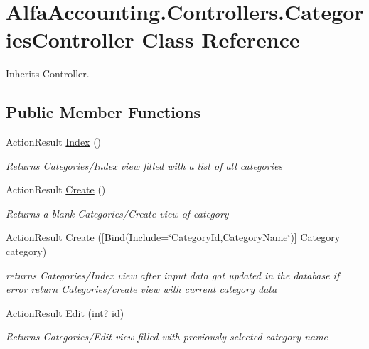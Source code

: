 \hypertarget{class_alfa_accounting_1_1_controllers_1_1_categories_controller}{}\section{Alfa\+Accounting.\+Controllers.\+Categories\+Controller Class Reference}
\label{class_alfa_accounting_1_1_controllers_1_1_categories_controller}


Inherits Controller.

\subsection*{Public Member Functions}
\begin{DoxyCompactItemize}
\item 
Action\+Result \hyperlink{class_alfa_accounting_1_1_controllers_1_1_categories_controller_a0a0bd358cfb6fc63f52f4a8c7d86b23f}{Index} ()
\begin{DoxyCompactList}\small\item\em Returns Categories/\+Index view filled with a list of all categories \end{DoxyCompactList}\item 
Action\+Result \hyperlink{class_alfa_accounting_1_1_controllers_1_1_categories_controller_afb5aa7304afa4262b327cfd80412ee32}{Create} ()
\begin{DoxyCompactList}\small\item\em Returns a blank Categories/\+Create view of category \end{DoxyCompactList}\item 
Action\+Result \hyperlink{class_alfa_accounting_1_1_controllers_1_1_categories_controller_a7bb4f8825f6827ccf2acdb3a665e0960}{Create} (\mbox{[}Bind(Include=\char`\"{}Category\+Id,Category\+Name\char`\"{})\mbox{]} Category category)
\begin{DoxyCompactList}\small\item\em returns Categories/\+Index view after input data got updated in the database if error return Categories/create view with current category data \end{DoxyCompactList}\item 
Action\+Result \hyperlink{class_alfa_accounting_1_1_controllers_1_1_categories_controller_a43567ef33be19e3785f033d50de30fa6}{Edit} (int? id)
\begin{DoxyCompactList}\small\item\em Returns Categories/\+Edit view filled with previously selected category name \end{DoxyCompactList}\item 

\end{DoxyCompactItemize}
